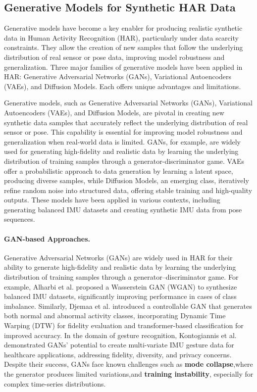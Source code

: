 \subsection{Generative Models for Synthetic HAR Data}

Generative models have become a key enabler for producing realistic synthetic data in Human Activity Recognition (HAR), particularly under data scarcity constraints. They allow the creation of new samples that follow the underlying distribution of real sensor or pose data, improving model robustness and generalization. Three major families of generative models have been applied in HAR: Generative Adversarial Networks (GANs), Variational Autoencoders (VAEs), and Diffusion Models. Each offers unique advantages and limitations.

Generative models, such as Generative Adversarial Networks (GANs), Variational Autoencoders (VAEs), and Diffusion Models, are pivotal in creating new synthetic data samples that accurately reflect the underlying distribution of real sensor or pose. This capability is essential for improving model robustness and generalization when real-world data is limited. GANs, for example, are widely used for generating high-fidelity and realistic data by learning the underlying distribution of training samples through a generator-discriminator game. VAEs offer a probabilistic approach to data generation by learning a latent space, producing diverse samples, while Diffusion Models, an emerging class, iteratively refine random noise into structured data, offering stable training and high-quality outputs. These models have been applied in various contexts, including generating balanced IMU datasets and creating synthetic IMU data from pose sequences.

\paragraph{GAN-based Approaches.}
Generative Adversarial Networks (GANs) are widely used in HAR for their ability to generate high-fidelity and realistic data by learning the underlying distribution of training samples through a generator–discriminator game. For example, Alharbi et al. \cite{alharbi2020synthetic} proposed a Wasserstein GAN (WGAN) to synthesize balanced IMU datasets, significantly improving performance in cases of class imbalance. Similarly, Djemaa et al. \cite{djemaa2024improved} introduced a controllable GAN that generates both normal and abnormal activity classes, incorporating Dynamic Time Warping (DTW) for fidelity evaluation and transformer-based classification for improved accuracy. In the domain of gesture recognition, Kontogiannis et al. \cite{kontogiannis2024exploring} demonstrated GANs’ potential to create multi-variate IMU gesture data for healthcare applications, addressing fidelity, diversity, and privacy concerns. Despite their success, GANs face known challenges such as \textbf{mode collapse},where the generator produces limited variations,and \textbf{training instability}, especially for complex time-series distributions.

